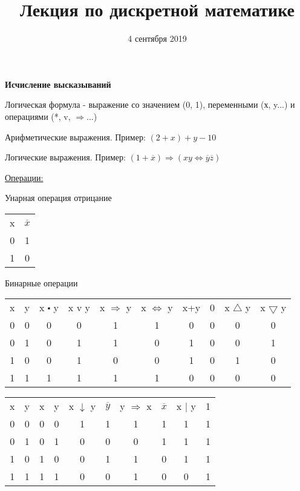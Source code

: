 \documentclass{article}
\title{Лекция по дискретной математике}
\date{4 сентября 2019}
\begin{document}
 
\maketitle

\textbf{Исчисление высказываний}

Логическая формула - выражение со значением (0, 1), переменными (х, y...) и операциями (*, v, $\Rightarrow$...)

Арифметические выражения. Пример: $(2+x) + y - 10$

Логические выражения. Пример: $(1 + \overline{x}) \Rightarrow (x y \Leftrightarrow \overline{y} \overline{z})$

\underline{Операции:}

Унарная операция отрицание

\begin{center}
\begin{tabular}{ |c|c| } 
 \hline
 x & $\overline{x}$  \\ 
 0 & 1 \\ 
 1 & 0 \\ 
 \hline
\end{tabular}
\end{center}

Бинарные операции
\begin{center}
\begin{tabular}{ |c|c|c|c|c|c|c|c|c|c| } 
 \hline
 x & y & x $\centerdot$ y & x v y & x $\Rightarrow$ y & x $\Leftrightarrow$ y & x+y & 0 & x $\bigtriangleup$ y & x $\bigtriangledown$ y \\ 
 0 & 0 & 0 & 0 & 1 & 1 & 0 & 0 & 0 & 0 \\ 
 0 & 1 & 0 & 1 & 1 & 0 & 1 & 0 & 0 & 1 \\ 
 1 & 0 & 0 & 1 & 0 & 0 & 1 & 0 & 1 & 0 \\
 1 & 1 & 1 & 1 & 1 & 1 & 0 & 0 & 0 & 0 \\
 \hline
\end{tabular}
\end{center}

\begin{center}
\begin{tabular}{ |c|c|c|c|c|c|c|c|c|c| } 
 \hline
 x & y & x & y & x $\downarrow$ y & $\overline{y}$ & y $\Rightarrow$ x & $\overline{x}$ & x $\mid$ y & 1  \\ 
 0 & 0 & 0 & 0 & 1 & 1 & 1 & 1 & 1 & 1 \\ 
 0 & 1 & 0 & 1 & 0 & 0 & 0 & 1 & 1 & 1 \\ 
 1 & 0 & 1 & 0 & 0 & 1 & 1 & 0 & 1 & 1 \\
 1 & 1 & 1 & 1 & 0 & 0 & 1 & 0 & 0 & 1 \\
 \hline
\end{tabular}
\end{center}
\end{document}
